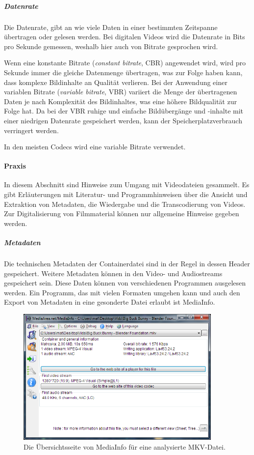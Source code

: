 \label{video-datenrate}
\subparagraph{Datenrate} Die Datenrate, gibt an wie viele Daten in einer bestimmten Zeitspanne übertragen oder gelesen werden. Bei digitalen Videos wird die Datenrate in Bits pro Sekunde gemessen, weshalb hier auch von Bitrate gesprochen wird. 

Wenn eine konstante Bitrate (\emph{constant bitrate}, CBR) angewendet wird, wird pro Sekunde immer die gleiche Datenmenge übertragen, was zur Folge haben kann, dass komplexe Bildinhalte an Qualität verlieren. Bei der Anwendung einer variablen Bitrate (\emph{variable bitrate}, VBR) variiert die Menge der übertragenen Daten je nach Komplexität des Bildinhaltes, was eine höhere Bildqualität zur Folge hat. Da bei der VBR ruhige und einfache Bildübergänge und -inhalte mit einer niedrigen Datenrate gespeichert werden, kann der Speicherplatzverbrauch verringert werden.

In den meisten Codecs wird eine variable Bitrate verwendet.

\pagebreak
\paragraph{Praxis} In diesem Abschnitt sind Hinweise zum Umgang mit Videodateien gesammelt. Es gibt Erläuterungen mit Literatur- und Programmhinweisen über die Ansicht und Extraktion von Metadaten, die Wiedergabe und die Transcodierung von Videos. Zur Digitalisierung von Filmmaterial können nur allgemeine Hinweise gegeben werden.

\subparagraph{Metadaten} Die technischen Metadaten der Containerdatei sind in der Regel in dessen Header gespeichert. Weitere Metadaten können in den Video- und Audiostreams gespeichert sein. Diese Daten können von verschiedenen Programmen ausgelesen werden. Ein Programm, das mit vielen Formaten umgehen kann und auch den Export von Metadaten in eine gesonderte Datei erlaubt ist MediaInfo.

\begin{figure}[!htp]
  \begin{center}
    \includegraphics[width=0.9\textwidth]{bilder/video_mediainfo}
  \end{center}
  \caption{Die Übersichtsseite von MediaInfo für eine analysierte MKV-Datei.}
\end{figure}

